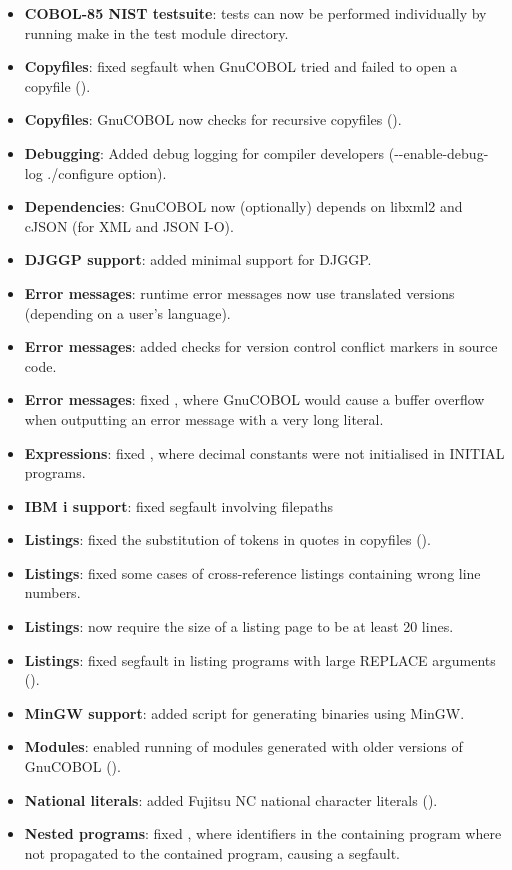 \begin{itemize}
\item \textbf{COBOL-85 NIST testsuite}: tests can now be performed individually by running make in the test module directory.
\item \textbf{Copyfiles}: fixed segfault when GnuCOBOL tried and failed to open a copyfile ().
\item \textbf{Copyfiles}: GnuCOBOL now checks for recursive copyfiles ().
\item \textbf{Debugging}: Added debug logging for compiler developers (-{}-enable-debug-log ./configure option).
\item \textbf{Dependencies}: GnuCOBOL now (optionally) depends on libxml2 and cJSON (for XML and JSON I-O).
\item \textbf{DJGGP support}: added minimal support for DJGGP.
\item \textbf{Error messages}: runtime error messages now use translated versions (depending on a user's language).
\item \textbf{Error messages}: added checks for version control conflict markers in source code.
\item \textbf{Error messages}: fixed , where GnuCOBOL would cause a buffer overflow when outputting an error message with a very long literal.
\item \textbf{Expressions}: fixed , where decimal constants were not initialised in INITIAL programs.
\item \textbf{IBM i support}: fixed segfault involving filepaths
\item \textbf{Listings}: fixed the substitution of tokens in quotes in copyfiles ().
\item \textbf{Listings}: fixed some cases of cross-reference listings containing wrong line numbers.
\item \textbf{Listings}: now require the size of a listing page to be at least 20 lines.
\item \textbf{Listings}: fixed segfault in listing programs with large REPLACE arguments ().
\item \textbf{MinGW support}: added script for generating binaries using MinGW.
\item \textbf{Modules}: enabled running of modules generated with older versions of GnuCOBOL ().
\item \textbf{National literals}: added Fujitsu NC national character literals ().
\item \textbf{Nested programs}: fixed , where identifiers in the containing program where not propagated to the contained program, causing a segfault.

\end{itemize}

